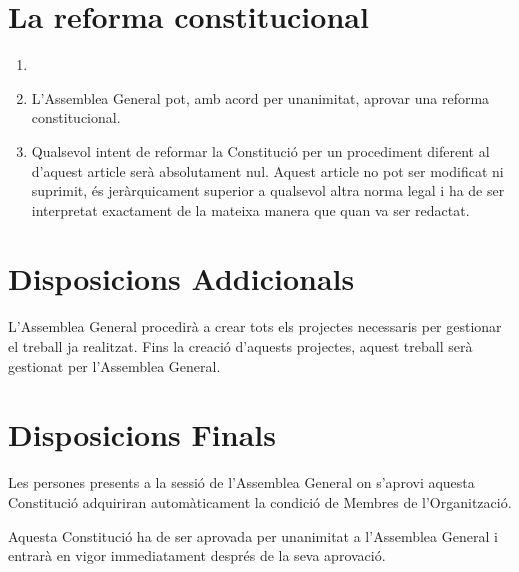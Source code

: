 \documentclass[12pt]{article}
\begin{document}
\section{La reforma constitucional}

\begin{art}
    \begin{enumerate}[1.]
        \item[]
        \item L'Assemblea General pot, amb acord per unanimitat, aprovar una reforma constitucional.
        \item Qualsevol intent de reformar la Constitució per un procediment diferent al d'aquest article serà absolutament nul. Aquest article no pot ser modificat ni suprimit, és jeràrquicament superior a qualsevol altra norma legal i ha de ser interpretat exactament de la mateixa manera que quan va ser redactat.
    \end{enumerate}
\end{art}

\section*{Disposicions Addicionals}

\begin{disp}
L'Assemblea General procedirà a crear tots els projectes necessaris per gestionar el treball ja realitzat. Fins la creació d'aquests projectes, aquest treball serà gestionat per l'Assemblea General.
\end{disp}



\section*{Disposicions Finals}

\begin{disp}
Les persones presents a la sessió de l'Assemblea General on s'aprovi aquesta Constitució adquiriran automàticament la condició de Membres de l'Organització.
\end{disp}

\begin{disp}
Aquesta Constitució ha de ser aprovada per unanimitat a l'Assemblea General i entrarà en vigor immediatament després de la seva aprovació.
\end{disp}
\end{document}
